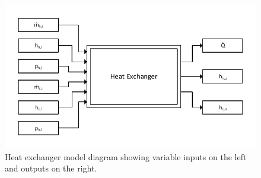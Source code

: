\begin{figure}[h]
	\centering

	\includegraphics[width=\textwidth]{figures/HeatExBlock.pdf} 

	\caption{Heat exchanger model diagram showing variable inputs on the left and outputs on the right.}
	\label{fig:heatexblock_label}

\end{figure}
